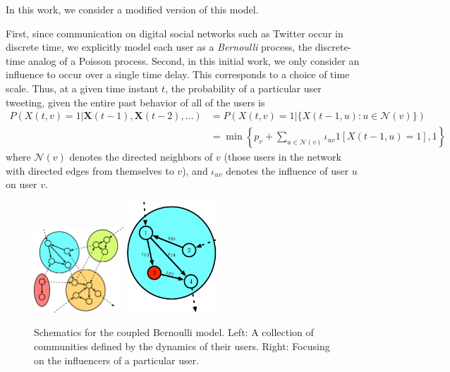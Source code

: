\documentclass[12pt]{article}
\begin{document}
In this work, we consider a modified version of this model.

First, since communication on digital social networks such as Twitter occur in discrete time, we explicitly model each user as a \emph{Bernoulli} process, the discrete-time analog of a Poisson process. Second, in this initial work, we only consider an influence to occur over a single time delay. This corresponds to a choice of time scale. Thus, at a given time instant $t$, the probability of a particular user tweeting, given the entire past behavior of all of the users is
\begin{align}
	P(X(t, v) = 1 | \mathbf{X}(t-1), \mathbf{X}(t-2), \ldots) &= P(X(t,v) = 1 | \{ X(t-1, u) : u \in \mathcal{N}(v)\})\\
	&=\min \left\{p_{v} + \sum_{u \in \mathcal{N}(v)} \iota_{uv} 1[X(t-1, u) = 1], 1\right\} \label{Eq-Bernoulli_Model}
\end{align}
where $\mathcal{N}(v)$ denotes the directed neighbors of $v$ (those users in the network with directed edges from themselves to $v$), and $\iota_{uv}$ denotes the influence of user $u$ on user $v$.

\begin{figure}[h!]
  \centering
\includegraphics[width=0.3\textwidth]{Figures/Communities.eps} \hspace{1 in}
\includegraphics[width=0.3\textwidth]{Figures/Toy2.eps}
\caption{Schematics for the coupled Bernoulli model. Left: A collection of communities defined by the dynamics of their users. Right: Focusing on the influencers of a particular user.}
\label{Fig-Toy_Bernoulli}
\end{figure}
\end{document}
